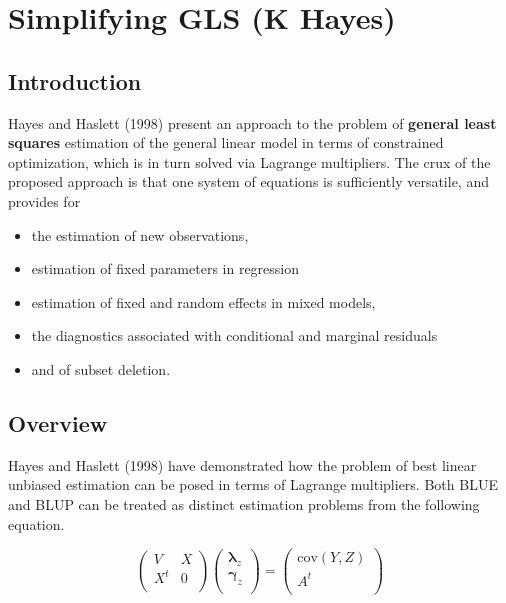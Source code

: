 \documentclass[12pt, a4paper]{article}
\begin{document}
\section{Simplifying GLS (K Hayes)}

\subsection{Introduction}

Hayes and Haslett (1998) present an approach to the problem of \textbf{general least squares} estimation of the general linear model in terms of constrained optimization, which is in turn solved via Lagrange multipliers. The crux of the proposed approach is that one system of equations is sufficiently versatile, and provides for \begin{itemize} \item the estimation of new observations, \item estimation of fixed parameters in regression \item estimation of fixed and random effects in mixed models,\item the diagnostics associated with conditional and marginal residuals \item and of subset deletion. \end{itemize}

\subsection{Overview}
Hayes and Haslett (1998) have demonstrated how the problem of best linear unbiased estimation can be posed in terms of Lagrange multipliers. Both BLUE and BLUP can be treated as distinct estimation problems from the following equation.

\begin{equation}
\left(  \begin{array}{cc} V & X \\    X^t & 0 \\
\end{array}\right)\left(  \begin{array}{c}    \boldsymbol{\lambda}_{z}\\   \boldsymbol{\gamma}_z \\  \end{array}
\right)=\left(  \begin{array}{c}    \mbox{cov}(Y,Z)\\   A^{t} \\  \end{array}\right)\end{equation}
\end{document}
